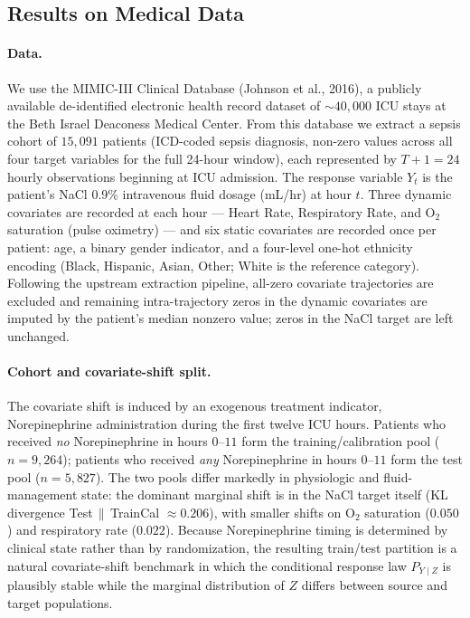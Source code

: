\documentclass{article}
\numberwithin{equation}{section}
\begin{document}
\subsection{Results on Medical Data}
\label{sec:experiments:medical}

\paragraph{Data.}
We use the MIMIC-III Clinical Database (Johnson et al., 2016), a publicly
available de-identified electronic health record dataset of $\sim\!\!40{,}000$
ICU stays at the Beth Israel Deaconess Medical Center.  From this database we
extract a sepsis cohort of $15{,}091$ patients (ICD-coded sepsis diagnosis,
non-zero values across all four target variables for the full 24-hour window),
each represented by $T+1 = 24$ hourly observations beginning at ICU admission.
The response variable $Y_t$ is the patient's NaCl 0.9\% intravenous fluid
dosage (mL/hr) at hour $t$.  Three dynamic covariates are recorded at each
hour --- Heart Rate, Respiratory Rate, and O$_2$ saturation (pulse oximetry)
--- and six static covariates are recorded once per patient: age, a binary
gender indicator, and a four-level one-hot ethnicity encoding (Black,
Hispanic, Asian, Other; White is the reference category).  Following the
upstream extraction pipeline, all-zero covariate trajectories are excluded and
remaining intra-trajectory zeros in the dynamic covariates are imputed by the
patient's median nonzero value; zeros in the NaCl target are left unchanged.

\paragraph{Cohort and covariate-shift split.}
The covariate shift is induced by an exogenous treatment indicator,
Norepinephrine administration during the first twelve ICU hours.  Patients
who received \emph{no} Norepinephrine in hours $0$--$11$ form the
training/calibration pool ($n = 9{,}264$); patients who received
\emph{any} Norepinephrine in hours $0$--$11$ form the test pool
($n = 5{,}827$).  The two pools differ markedly in physiologic and
fluid-management state: the dominant marginal shift is in the NaCl target
itself (KL divergence Test\,$\|$\,TrainCal $\approx 0.206$), with smaller
shifts on O$_2$ saturation ($0.050$) and respiratory rate ($0.022$).
Because Norepinephrine timing is determined by clinical state rather than by
randomization, the resulting train/test partition is a natural covariate-shift
benchmark in which the conditional response law $P_{Y \mid Z}$ is plausibly
stable while the marginal distribution of $Z$ differs between source and
target populations.
\end{document}
